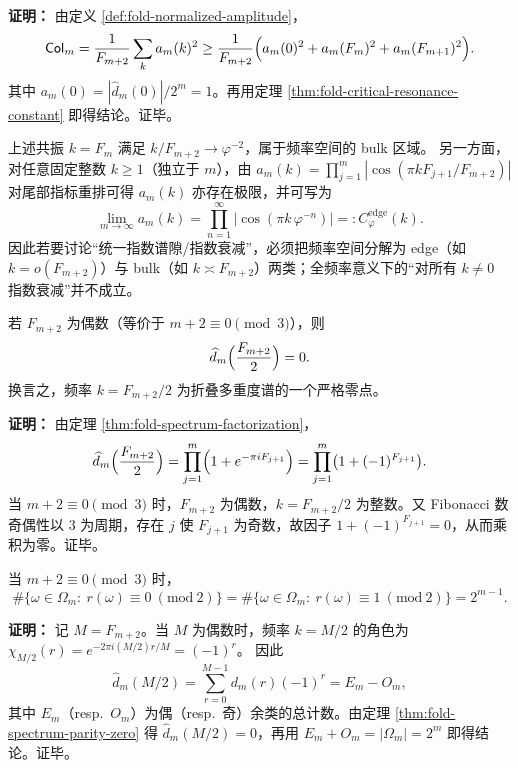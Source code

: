 \textbf{证明：}
由定义 \ref{def:fold-normalized-amplitude}，
\[
\mathsf{Col}_m=\frac{1}{F_{m+2}}\sum_{k}a_m(k)^2
\ge \frac{1}{F_{m+2}}\Bigl(a_m(0)^2+a_m(F_m)^2+a_m(F_{m+1})^2\Bigr).
\]
其中 \(a_m(0)=|\widehat d_m(0)|/2^m=1\)。再用定理 \ref{thm:fold-critical-resonance-constant} 即得结论。证毕。

\begin{remark}\label{rem:fold-edge-nondecay}
上述共振 \(k=F_m\) 满足 \(k/F_{m+2}\to \varphi^{-2}\)，属于频率空间的 bulk 区域。
另一方面，对任意固定整数 \(k\ge 1\)（独立于 \(m\)），由
\(
a_m(k)=\prod_{j=1}^m|\cos(\pi kF_{j+1}/F_{m+2})|
\)
对尾部指标重排可得 \(a_m(k)\) 亦存在极限，并可写为
\[
\lim_{m\to\infty}a_m(k)=\prod_{n=1}^{\infty}\bigl|\cos(\pi k\,\varphi^{-n})\bigr|=:C^{\mathrm{edge}}_\varphi(k).
\]
因此若要讨论“统一指数谱隙/指数衰减”，必须把频率空间分解为 edge（如 \(k=o(F_{m+2})\)）与 bulk（如 \(k\asymp F_{m+2}\)）两类；全频率意义下的“对所有 \(k\ne 0\) 指数衰减”并不成立。
\end{remark}

\begin{theorem}[奇偶性诱导的谱零点]
\label{thm:fold-spectrum-parity-zero}
若 $F_{m+2}$ 为偶数（等价于 $m+2\equiv 0\pmod 3$），则
\[
\widehat d_m\Bigl(\frac{F_{m+2}}{2}\Bigr)=0.
\]
换言之，频率 $k=F_{m+2}/2$ 为折叠多重度谱的一个严格零点。
\end{theorem}

\textbf{证明：}
由定理 \ref{thm:fold-spectrum-factorization}，
\[
\widehat d_m\Bigl(\frac{F_{m+2}}{2}\Bigr)=\prod_{j=1}^m\Bigl(1+e^{-\pi i F_{j+1}}\Bigr)
=\prod_{j=1}^m\bigl(1+(-1)^{F_{j+1}}\bigr).
\]
当 $m+2\equiv 0\pmod 3$ 时，$F_{m+2}$ 为偶数，$k=F_{m+2}/2$ 为整数。又 Fibonacci 数奇偶性以 3 为周期，存在 $j$ 使 $F_{j+1}$ 为奇数，故因子 $1+(-1)^{F_{j+1}}=0$，从而乘积为零。证毕。

\begin{corollary}[严格奇偶平衡律]\label{cor:fold-even-odd-balance}
当 $m+2\equiv 0\pmod 3$ 时，
\[
\#\{\omega\in\Omega_m:\ r(\omega)\equiv 0\ (\mathrm{mod}\ 2)\}
=
\#\{\omega\in\Omega_m:\ r(\omega)\equiv 1\ (\mathrm{mod}\ 2)\}
=2^{m-1}.
\]
\end{corollary}

\textbf{证明：}
记 $M=F_{m+2}$。当 $M$ 为偶数时，频率 $k=M/2$ 的角色为
\(
\chi_{M/2}(r)=e^{-2\pi i (M/2)r/M}=(-1)^r
\)。
因此
\[
\widehat d_m(M/2)=\sum_{r=0}^{M-1} d_m(r)(-1)^r
=E_m-O_m,
\]
其中 $E_m$（resp.\ $O_m$）为偶（resp.\ 奇）余类的总计数。由定理 \ref{thm:fold-spectrum-parity-zero} 得 $\widehat d_m(M/2)=0$，再用 $E_m+O_m=|\Omega_m|=2^m$ 即得结论。证毕。

